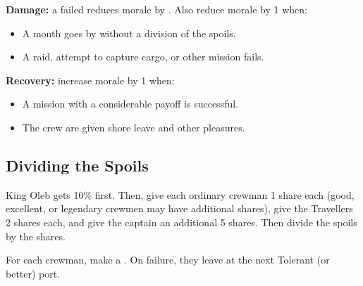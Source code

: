 \documentclass{cheatsheet}
\begin{document}
\begin{multicols}{2}
\textbf{Damage:} a failed  reduces morale by .
Also reduce morale by 1 when:

\begin{itemize}
\item A month goes by without a division of the spoils.
\item A raid, attempt to capture cargo, or other mission fails.
\end{itemize}

\textbf{Recovery:} increase morale by 1 when:

\begin{itemize}
\item A mission with a considerable payoff is successful.
\item The crew are given shore leave and other pleasures.
\end{itemize}

\subsection{Dividing the Spoils}

King Oleb gets 10\% first.  Then, give each ordinary crewman 1 share
each (good, excellent, or legendary crewmen may have additional
shares), give the Travellers 2 shares each, and give the captain an
additional 5 shares.  Then divide the spoils by the shares.

For each crewman, make a .  On failure, they
leave at the next Tolerant (or better) port.
\end{multicols}
\end{document}
